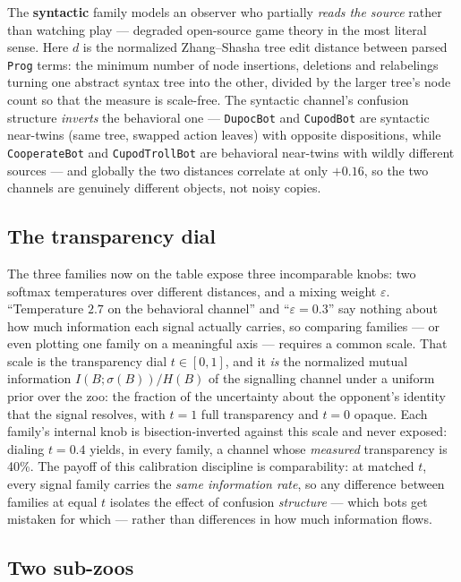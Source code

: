 \documentclass[11pt]{article}
\newcommand{\zoobot}[1]{\texttt{#1}}
\newcommand{\dupoc}{\zoobot{DupocBot}}
\newcommand{\cupod}{\zoobot{CupodBot}}
\begin{document}
The \textbf{syntactic} family models an observer who partially \emph{reads
the source} rather than watching play --- degraded open-source game theory
in the most literal sense. Here $d$ is the normalized Zhang--Shasha tree
edit distance between parsed \texttt{Prog} terms: the minimum number of
node insertions, deletions and relabelings turning one abstract syntax tree
into the other, divided by the larger tree's node count so that the measure
is scale-free. The syntactic
channel's confusion structure \emph{inverts} the behavioral one ---
\dupoc{} and \cupod{} are syntactic near-twins (same tree, swapped action
leaves) with opposite dispositions, while \zoobot{CooperateBot} and
\zoobot{CupodTrollBot} are behavioral near-twins with wildly different
sources --- and globally the two distances correlate at only $+0.16$, so
the two channels are genuinely different objects, not noisy copies.

\subsection{The transparency dial}

The three families now on the table expose three incomparable knobs: two
softmax temperatures over different distances, and a mixing weight
$\varepsilon$. ``Temperature $2.7$ on the behavioral channel'' and
``$\varepsilon = 0.3$'' say nothing about how much information each signal
actually carries, so comparing families --- or even plotting one family on
a meaningful axis --- requires a common scale. That scale is the
transparency dial $t \in [0,1]$, and it \emph{is} the normalized mutual
information $I(B;\sigma(B))/H(B)$ of the signalling channel under a
uniform prior over the zoo: the fraction of the uncertainty about the
opponent's identity that the signal resolves, with $t = 1$ full
transparency and $t = 0$ opaque. Each family's internal knob is
bisection-inverted against this scale and never exposed: dialing
$t = 0.4$ yields, in every family, a channel whose \emph{measured}
transparency is 40\%. The payoff of this calibration discipline is
comparability: at matched $t$, every signal family carries the \emph{same
information rate}, so any difference between families at equal $t$
isolates the effect of confusion \emph{structure} --- which bots get
mistaken for which --- rather than differences in how much information
flows.

\subsection{Two sub-zoos}
\end{document}
